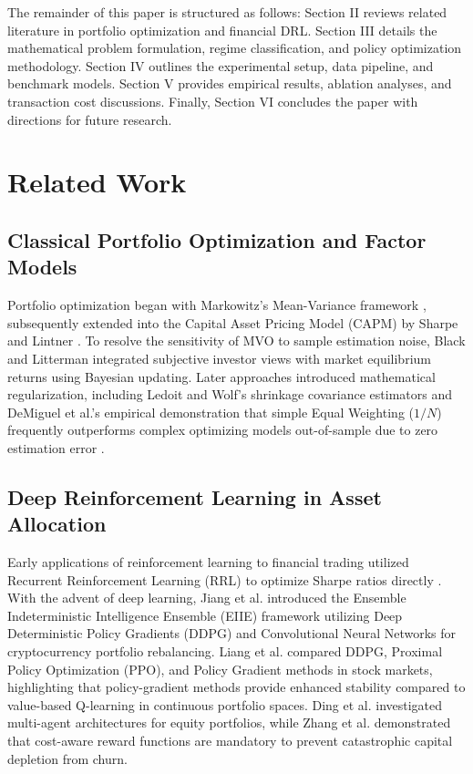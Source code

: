 \documentclass[conference]{IEEEtran}
\begin{document}
The remainder of this paper is structured as follows: Section II reviews related literature in portfolio optimization and financial DRL. Section III details the mathematical problem formulation, regime classification, and policy optimization methodology. Section IV outlines the experimental setup, data pipeline, and benchmark models. Section V provides empirical results, ablation analyses, and transaction cost discussions. Finally, Section VI concludes the paper with directions for future research.

\section{Related Work}

\subsection{Classical Portfolio Optimization and Factor Models}
Portfolio optimization began with Markowitz's Mean-Variance framework \cite{markowitz1952portfolio}, subsequently extended into the Capital Asset Pricing Model (CAPM) by Sharpe \cite{sharpe1964capital} and Lintner \cite{lintner1965valuation}. To resolve the sensitivity of MVO to sample estimation noise, Black and Litterman \cite{black1992global} integrated subjective investor views with market equilibrium returns using Bayesian updating. Later approaches introduced mathematical regularization, including Ledoit and Wolf's shrinkage covariance estimators \cite{ledoit2004well} and DeMiguel et al.'s empirical demonstration that simple Equal Weighting ($1/N$) frequently outperforms complex optimizing models out-of-sample due to zero estimation error \cite{demiguel2009optimal}.

\subsection{Deep Reinforcement Learning in Asset Allocation}
Early applications of reinforcement learning to financial trading utilized Recurrent Reinforcement Learning (RRL) to optimize Sharpe ratios directly \cite{moody2001learning}. With the advent of deep learning, Jiang et al. \cite{jiang2017deep} introduced the Ensemble Indeterministic Intelligence Ensemble (EIIE) framework utilizing Deep Deterministic Policy Gradients (DDPG) and Convolutional Neural Networks for cryptocurrency portfolio rebalancing. Liang et al. \cite{liang2018adversarial} compared DDPG, Proximal Policy Optimization (PPO), and Policy Gradient methods in stock markets, highlighting that policy-gradient methods provide enhanced stability compared to value-based Q-learning in continuous portfolio spaces. Ding et al. \cite{ding2020deep} investigated multi-agent architectures for equity portfolios, while Zhang et al. \cite{zhang2020deep} demonstrated that cost-aware reward functions are mandatory to prevent catastrophic capital depletion from churn.
\end{document}
